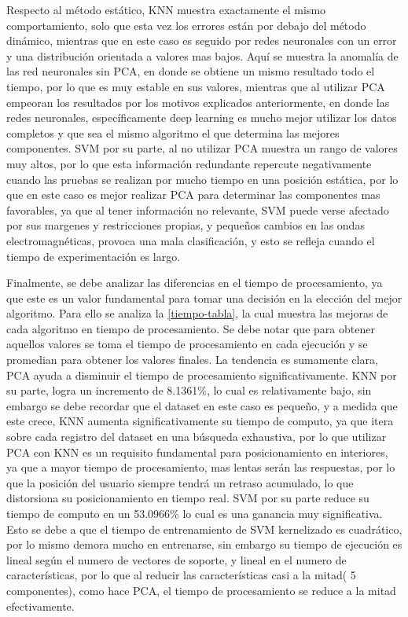Respecto al método estático, KNN muestra exactamente el mismo comportamiento, solo que esta vez los errores están por debajo del método dinámico, mientras que en este caso es seguido por redes neuronales con un error y una distribución orientada a valores mas bajos. Aquí se muestra la anomalía de las red neuronales sin PCA, en donde se obtiene un mismo resultado todo el tiempo, por lo que es muy estable en sus valores, mientras que al utilizar PCA empeoran los resultados por los motivos explicados anteriormente, en donde las redes neuronales, específicamente deep learning es mucho mejor utilizar los datos completos y que sea el mismo algoritmo el que determina las mejores componentes. SVM por su parte, al no utilizar PCA muestra un rango de valores muy altos, por lo que esta información redundante repercute negativamente cuando las pruebas se realizan por mucho tiempo en una posición estática, por lo que en este caso es mejor realizar PCA para determinar las componentes mas favorables, ya que al tener información no relevante, SVM puede verse afectado por sus margenes y restricciones propias, y pequeños cambios en las ondas electromagnéticas, provoca una mala clasificación, y esto se refleja cuando el tiempo de experimentación es largo.

Finalmente, se debe analizar las diferencias en el tiempo de procesamiento, ya que este es un valor fundamental para tomar una decisión en la elección del mejor algoritmo. Para ello se analiza la \autoref{tiempo-tabla}, la cual muestra las mejoras de cada algoritmo en tiempo de procesamiento. Se debe notar que para obtener aquellos valores se toma el tiempo de procesamiento en cada ejecución y se promedian para obtener los valores finales. La tendencia es sumamente clara, PCA ayuda a disminuir el tiempo de procesamiento significativamente. KNN por su parte, logra un incremento de 8.1361\%, lo cual es relativamente bajo, sin embargo se debe recordar que el dataset en este caso es pequeño, y a medida que este crece, KNN aumenta significativamente su tiempo de computo, ya que itera sobre cada registro del dataset en una búsqueda exhaustiva, por lo que utilizar PCA con KNN es un requisito fundamental para posicionamiento en interiores, ya que a mayor tiempo de procesamiento, mas lentas serán las respuestas, por lo que la posición del usuario siempre tendrá un retraso acumulado, lo que distorsiona su posicionamiento en tiempo real. SVM por su parte reduce su tiempo de computo en un 53.0966\% lo cual es una ganancia muy significativa. Esto se debe a que el tiempo de entrenamiento de SVM kernelizado es cuadrático, por lo mismo demora mucho en entrenarse, sin embargo su tiempo de ejecución es lineal según el numero de vectores de soporte, y lineal en el numero de características, por lo que al reducir las características casi a la mitad( 5 componentes), como hace PCA, el tiempo de procesamiento se reduce a la mitad efectivamente.

